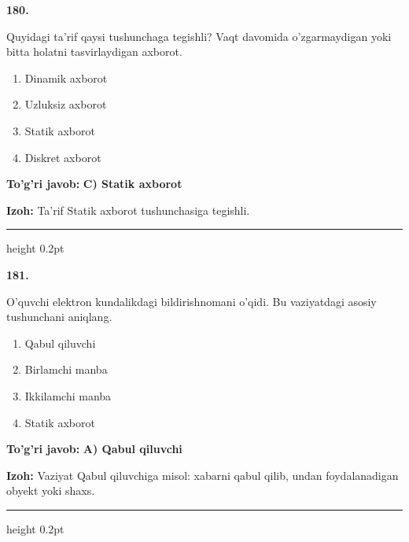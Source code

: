 \documentclass[10pt,a4paper,oneside]{article}
\begin{document}
\noindent\textbf{\color{ink}180.}
\par
Quyidagi ta'rif qaysi tushunchaga tegishli? Vaqt davomida o'zgarmaydigan yoki bitta holatni tasvirlaydigan axborot.
\begin{enumerate}[label=\Alph*),leftmargin=9mm]
\item Dinamik axborot
\item Uzluksiz axborot
\item Statik axborot
\item Diskret axborot
\end{enumerate}
\begin{tcolorbox}[enhanced,breakable,colback=teal!4,colframe=teal!50!black,boxrule=0.5pt,arc=1.1mm,left=3mm,right=3mm,top=1.7mm,bottom=1.7mm,before skip=2mm,after skip=2mm]
\textbf{\color{teal}To'g'ri javob:} \textbf{C) Statik axborot}
\par\smallskip
\textbf{Izoh:} Ta'rif Statik axborot tushunchasiga tegishli.
\end{tcolorbox}
\vspace{2mm}\hrule height 0.2pt \vspace{3mm}

\noindent\textbf{\color{ink}181.}
\par
O'quvchi elektron kundalikdagi bildirishnomani o'qidi. Bu vaziyatdagi asosiy tushunchani aniqlang.
\begin{enumerate}[label=\Alph*),leftmargin=9mm]
\item Qabul qiluvchi
\item Birlamchi manba
\item Ikkilamchi manba
\item Statik axborot
\end{enumerate}
\begin{tcolorbox}[enhanced,breakable,colback=teal!4,colframe=teal!50!black,boxrule=0.5pt,arc=1.1mm,left=3mm,right=3mm,top=1.7mm,bottom=1.7mm,before skip=2mm,after skip=2mm]
\textbf{\color{teal}To'g'ri javob:} \textbf{A) Qabul qiluvchi}
\par\smallskip
\textbf{Izoh:} Vaziyat Qabul qiluvchiga misol: xabarni qabul qilib, undan foydalanadigan obyekt yoki shaxs.
\end{tcolorbox}
\vspace{2mm}\hrule height 0.2pt \vspace{3mm}
\end{document}
